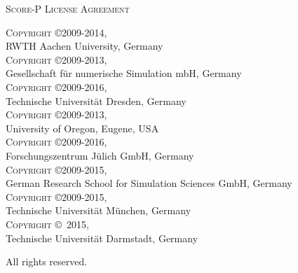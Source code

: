 \begin{center}
  \textsc{\LARGE Score-P License Agreement}
\end{center}

\textsc{Copyright \copyright 2009-2014,} \\
\hspace*{10mm}RWTH Aachen University, Germany \\
\textsc{Copyright \copyright 2009-2013,} \\
\hspace*{10mm}Gesellschaft f{\"u}r numerische Simulation mbH, Germany \\
\textsc{Copyright \copyright 2009-2016,} \\
\hspace*{10mm}Technische Universit{\"a}t Dresden, Germany \\
\textsc{Copyright \copyright 2009-2013,} \\
\hspace*{10mm}University of Oregon, Eugene, USA \\
\textsc{Copyright \copyright 2009-2016,} \\
\hspace*{10mm}Forschungszentrum J{\"u}lich GmbH, Germany \\
\textsc{Copyright \copyright 2009-2015,} \\
\hspace*{10mm}German Research School for Simulation Sciences GmbH, Germany \\
\textsc{Copyright \copyright 2009-2015,} \\
\hspace*{10mm}Technische Universit{\"a}t M{\"u}nchen, Germany \\
\textsc{Copyright \copyright\, 2015,} \\
\hspace*{10mm}Technische Universit{\"a}t Darmstadt, Germany

All rights reserved.
\vfill

